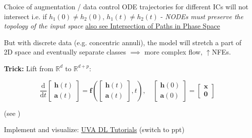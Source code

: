 \documentclass[usenames,dvipsnames]{beamer}
\theoremstyle{definition}
\let\oldcite=\cite
\renewcommand{\cite}[2][]{\textcolor{green}{\oldcite[#1]{#2}}}
\begin{document}
\begin{frame}{Choice of augmentation / data control}
    ODE trajectories for different ICs will not intersect i.e. if $h_1(0) \neq h_2(0)$, $h_1(t) \neq h_2(t)$ - \emph{NODEs must preserve the topology of the input space} \href{https://physics.stackexchange.com/questions/578836/paths-in-phase-space-can-never-intersect-but-why-cant-they-merge}{also see Intersection of Paths in Phase Space}

    But with discrete data (e.g. concentric annuli), the model will stretch a part of 2D space and eventually separate classes $\implies$ more complex flow, $\uparrow$NFEs.

    \textbf{Trick:} Lift from $\mathbb{R}^d$ to $\mathbb{R}^{d + p}$: 
    
    $$\frac{\mathrm d}{\mathrm dt}\begin{bmatrix}\mathbf h(t)\\\mathbf a(t)\end{bmatrix}=\mathbf f\left(\begin{bmatrix}\mathbf h(t)\\\mathbf a(t)\end{bmatrix}, t\right),\quad\begin{bmatrix}\mathbf h(0)\\\mathbf a(0)\end{bmatrix}=\begin{bmatrix}\mathbf x\\\mathbf0\end{bmatrix}$$

    (see \cite{dupont_augmented_2019}) 
    
    Implement and visualize: \href{https://uvadlc-notebooks.readthedocs.io/en/latest/tutorial_notebooks/DL2/Dynamical_systems/dynamical_systems_neural_odes.html}{UVA DL Tutorials} (switch to ppt)

\end{frame}
\end{document}

